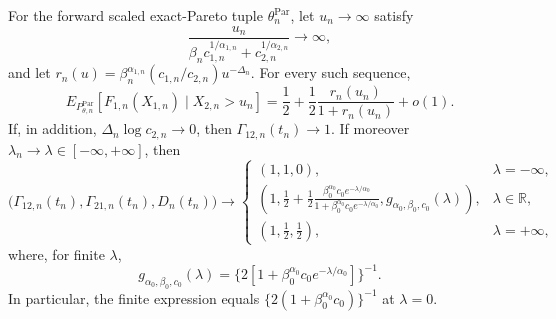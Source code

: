 For the forward scaled exact-Pareto tuple \(\theta_n^{\mathrm{Par}}\), let \(u_n\to\infty\) satisfy
\[
\frac{u_n}{\beta_n c_{1,n}^{1/\alpha_{1,n}}+c_{2,n}^{1/\alpha_{2,n}}}\to\infty,
\]
and let \(r_n(u)=\beta_n^{\alpha_{1,n}}(c_{1,n}/c_{2,n})u^{-\Delta_n}\). For every such sequence,
\[
E_{P_{\theta,n}^{\mathrm{Par}}}[F_{1,n}(X_{1,n})\mid X_{2,n}>u_n]
=\frac12+\frac12\frac{r_n(u_n)}{1+r_n(u_n)}+o(1).
\]
If, in addition, \(\Delta_n\log c_{2,n}\to0\), then \(\Gamma_{12,n}(t_n)\to1\). If moreover \(\lambda_n\to\lambda\in[-\infty,+\infty]\), then
\[
\bigl(\Gamma_{12,n}(t_n),\Gamma_{21,n}(t_n),D_n(t_n)\bigr)
\longrightarrow
\begin{cases}
(1,1,0), & \lambda=-\infty,\\
\left(1,\displaystyle\frac12+\frac12\frac{\beta_0^{\alpha_0}c_0e^{-\lambda/\alpha_0}}{1+\beta_0^{\alpha_0}c_0e^{-\lambda/\alpha_0}},
g_{\alpha_0,\beta_0,c_0}(\lambda)\right), & \lambda\in\mathbb R,\\
(1,\frac12,\frac12), & \lambda=+\infty,
\end{cases}
\]
where, for finite \(\lambda\),
\[
g_{\alpha_0,\beta_0,c_0}(\lambda)
=\{2[1+\beta_0^{\alpha_0}c_0e^{-\lambda/\alpha_0}]\}^{-1}.
\]
In particular, the finite expression equals \(\{2(1+\beta_0^{\alpha_0}c_0)\}^{-1}\) at \(\lambda=0\).